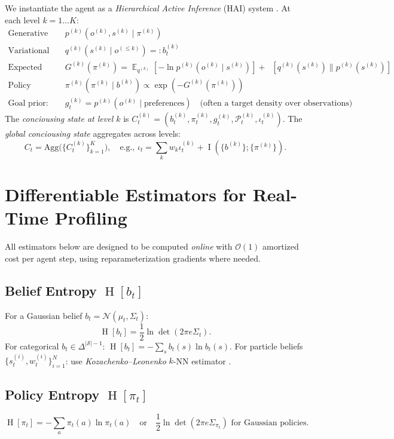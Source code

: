\documentclass[11pt,a4paper]{article}
\DeclareMathOperator{\KL}{D_{\mathrm{KL}}}
\DeclareMathOperator{\MI}{I}
\DeclareMathOperator{\Ent}{H}
\DeclareMathOperator{\E}{\mathbb{E}}
\newcommand{\Sset}{\mathcal{S}}
\newcommand{\Pvec}{\mathcal{P}}
\newcommand{\given}{\mid}
\begin{document}
We instantiate the agent as a \emph{Hierarchical Active Inference} (HAI) system \cite{parr2022active, friston2017active}. At each level $k=1\dots K$:
\begin{align}
\text{Generative model:} \quad & p^{(k)}(o^{(k)}, s^{(k)} \given \pi^{(k)}) \\
\text{Variational posterior:} \quad & q^{(k)}(s^{(k)} \given o^{(\le k)}) =: b^{(k)}_t \\
\text{Expected Free Energy:} \quad & G^{(k)}(\pi^{(k)}) = \E_{q^{(k)}}[ -\ln p^{(k)}(o^{(k)} \given s^{(k)}) ] + \KL[ q^{(k)}(s^{(k)}) \parallel p^{(k)}(s^{(k)}) ] \\
\text{Policy (intention):} \quad & \pi^{(k)}(\pi^{(k)} \given b^{(k)}) \propto \exp( - G^{(k)}(\pi^{(k)}) ) \\
\text{Goal prior:} \quad & g^{(k)}_t = p^{(k)}(o^{(k)} \given \text{preferences}) \quad \text{(often a target density over observations)}
\end{align}
The \emph{conciousing state at level $k$} is $C^{(k)}_t = (b^{(k)}_t, \pi^{(k)}_t, g^{(k)}_t, \Pvec^{(k)}_t, \iota^{(k)}_t)$.
The \emph{global conciousing state} aggregates across levels:
\[
C_t = \mathrm{Agg}\bigl( \{ C^{(k)}_t \}_{k=1}^K \bigr), \quad \text{e.g., } \iota_t = \sum_k w_k \iota^{(k)}_t + \MI( \{b^{(k)}\}; \{\pi^{(k)}\} ).
\]

\section{Differentiable Estimators for Real-Time Profiling}
\label{sec:estimators}

All estimators below are designed to be computed \emph{online} with $\mathcal{O}(1)$ amortized cost per agent step, using reparameterization gradients where needed.

\subsection{Belief Entropy $\Ent[b_t]$}
For a Gaussian belief $b_t = \mathcal{N}(\mu_t, \Sigma_t)$:
\[
\Ent[b_t] = \frac{1}{2} \ln \det(2\pi e \Sigma_t).
\]
For categorical $b_t \in \Delta^{|\Sset|-1}$: $\Ent[b_t] = -\sum_s b_t(s) \ln b_t(s)$.
For particle beliefs $\{s^{(i)}_t, w^{(i)}_t\}_{i=1}^N$: use \emph{Kozachenko--Leonenko} $k$-NN estimator \cite{kozachenko1987sample}.

\subsection{Policy Entropy $\Ent[\pi_t]$}
\[
\Ent[\pi_t] = -\sum_a \pi_t(a) \ln \pi_t(a) \quad \text{or} \quad \frac{1}{2}\ln\det(2\pi e \Sigma_{\pi_t}) \text{ for Gaussian policies}.
\]
\end{document}
